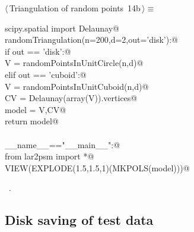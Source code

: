 \documentclass[11pt,oneside]{article}	%
\begin{document}
\begin{flushleft} \small \label{scrap25}
\protect{}$\langle\,$Triangulation of random points\nobreak\ {\footnotesize 14b}$\,\rangle\equiv$
\vspace{-1ex}
\begin{list}{}{} \item
\mbox{}\verb@from scipy.spatial import Delaunay@\\
\mbox{}\verb@def randomTriangulation(n=200,d=2,out='disk'):@\\
\mbox{}\verb@   if out == 'disk':@\\
\mbox{}\verb@      V = randomPointsInUnitCircle(n,d)@\\
\mbox{}\verb@   elif out == 'cuboid':@\\
\mbox{}\verb@      V = randomPointsInUnitCuboid(n,d)@\\
\mbox{}\verb@   CV = Delaunay(array(V)).vertices@\\
\mbox{}\verb@   model = V,CV@\\
\mbox{}\verb@   return model@\\
\mbox{}\verb@@\\
\mbox{}\verb@if __name__=="__main__":@\\
\mbox{}\verb@   from lar2psm import *@\\
\mbox{}\verb@   VIEW(EXPLODE(1.5,1.5,1)(MKPOLS(model)))@\\
\mbox{}\verb@@{\NWsep}
\end{list}
\vspace{-1ex}
\footnotesize\addtolength{\baselineskip}{-1ex}
\begin{list}{}{\setlength{\itemsep}{-\parsep}\setlength{\itemindent}{-\leftmargin}}
\item \NWtxtMacroRefIn\ .
\end{list}
\end{flushleft}

\subsection{Disk saving of test data}
\end{document}
